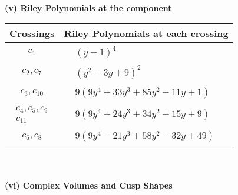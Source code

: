 \documentclass[1p]{elsarticle_modified}
\theoremstyle{definition}
\begin{document}
\newpage\renewcommand{\arraystretch}{1}
\flushleft \textbf{(v) Riley Polynomials at the component}\newline \\
\begin{tabular}{m{50pt}|m{274pt}}
Crossings & \hspace{64pt}Riley Polynomials at each crossing \\
\hline $$\begin{aligned}c_{1}\end{aligned}$$&$\begin{aligned}
&(y-1)^4
\end{aligned}$\\
\hline $$\begin{aligned}c_{2},c_{7}\end{aligned}$$&$\begin{aligned}
&(y^2-3 y+9)^2
\end{aligned}$\\
\hline $$\begin{aligned}c_{3},c_{10}\end{aligned}$$&$\begin{aligned}
&9(9 y^4+33 y^3+85 y^2-11 y+1)
\end{aligned}$\\
\hline $$\begin{aligned}c_{4},c_{5},c_{9}\\c_{11}\end{aligned}$$&$\begin{aligned}
&9(9 y^4+24 y^3+34 y^2+15 y+9)
\end{aligned}$\\
\hline $$\begin{aligned}c_{6},c_{8}\end{aligned}$$&$\begin{aligned}
&9(9 y^4-21 y^3+58 y^2-32 y+49)
\end{aligned}$\\
\hline
\end{tabular}\\~\\
\newpage\flushleft \textbf{(vi) Complex Volumes and Cusp Shapes}
\end{document}

